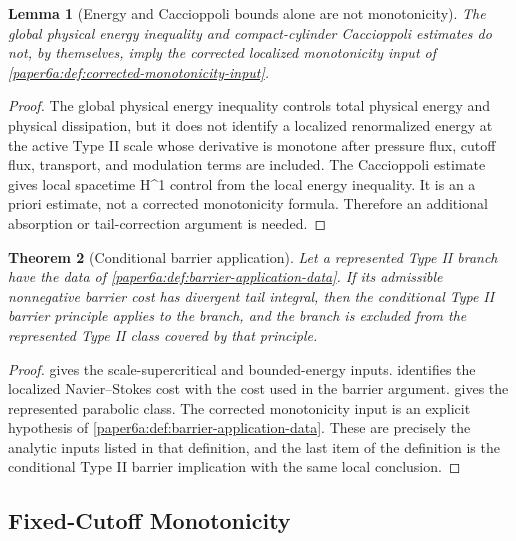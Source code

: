 \documentclass[11pt]{amsart}
\def\({}%
\def\){}%
\theoremstyle{plain}
\newtheorem{theorem}{Theorem}[section]
\newtheorem{lemma}[theorem]{Lemma}
\theoremstyle{definition}
\theoremstyle{remark}
\begin{document}
\begin{lemma}[Energy and Caccioppoli bounds alone are not monotonicity]
\label{paper6a:lem:caccioppoli-not-monotonicity}
The global physical energy inequality and compact-cylinder Caccioppoli
estimates do not, by themselves, imply the corrected localized monotonicity
input of \cref{paper6a:def:corrected-monotonicity-input}.
\end{lemma}

\begin{proof}
The global physical energy inequality controls total physical energy and
physical dissipation, but it does not identify a localized renormalized energy
at the active Type II scale whose derivative is monotone after pressure flux,
cutoff flux, transport, and modulation terms are included.  The Caccioppoli
estimate gives local spacetime \(H^1\) control from the local energy inequality.
It is an a priori estimate, not a corrected monotonicity formula.  Therefore an
additional absorption or tail-correction argument is needed.
\end{proof}

\begin{theorem}[Conditional barrier application]\label{paper6a:thm:conditional-barrier-application}
Let a represented Type II branch have the data of
\cref{paper6a:def:barrier-application-data}.  If its admissible nonnegative
barrier cost has divergent tail integral, then the conditional Type II barrier
principle applies to the branch, and the branch is excluded from the represented
Type II class covered by that principle.
\end{theorem}

\begin{proof}
 gives the scale-supercritical and
bounded-energy inputs.   identifies the
localized Navier--Stokes cost with the cost used in the barrier argument.
 gives the represented parabolic class.
The corrected monotonicity input is an explicit hypothesis of
\cref{paper6a:def:barrier-application-data}.  These are precisely the analytic
inputs listed in that definition, and the last item of the definition is the
conditional Type II barrier implication with the same local conclusion.
\end{proof}

\subsection{Fixed-Cutoff Monotonicity}
\end{document}
